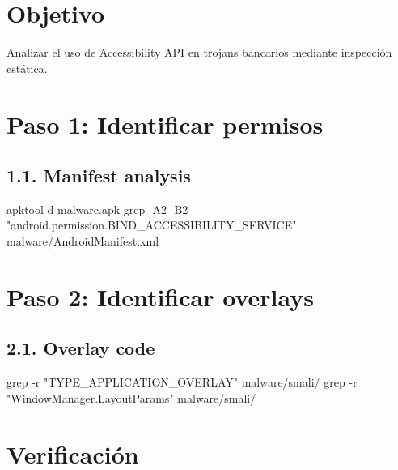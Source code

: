 \documentclass[
  letterpaper,
]{report}
\newenvironment{Shaded}{\begin{snugshade}}{\end{snugshade}}
\newcommand{\AttributeTok}[1]{\textcolor[rgb]{0.40,0.45,0.13}{#1}}
\newcommand{\ExtensionTok}[1]{\textcolor[rgb]{0.00,0.23,0.31}{#1}}
\newcommand{\FunctionTok}[1]{\textcolor[rgb]{0.28,0.35,0.67}{#1}}
\newcommand{\NormalTok}[1]{\textcolor[rgb]{0.00,0.23,0.31}{#1}}
\newcommand{\StringTok}[1]{\textcolor[rgb]{0.13,0.47,0.30}{#1}}
\begin{document}
\section{Objetivo}\label{objetivo-5}

Analizar el uso de Accessibility API en trojans bancarios mediante
inspección estática.

\section{Paso 1: Identificar
permisos}\label{paso-1-identificar-permisos}

\subsection{1.1. Manifest analysis}\label{manifest-analysis}

\begin{Shaded}
\begin{Highlighting}[]
\ExtensionTok{apktool}\NormalTok{ d malware.apk}
\FunctionTok{grep} \AttributeTok{{-}A2} \AttributeTok{{-}B2} \StringTok{"android.permission.BIND\_ACCESSIBILITY\_SERVICE"}\NormalTok{ malware/AndroidManifest.xml}
\end{Highlighting}
\end{Shaded}

\section{Paso 2: Identificar
overlays}\label{paso-2-identificar-overlays}

\subsection{2.1. Overlay code}\label{overlay-code}

\begin{Shaded}
\begin{Highlighting}[]
\FunctionTok{grep} \AttributeTok{{-}r} \StringTok{"TYPE\_APPLICATION\_OVERLAY"}\NormalTok{ malware/smali/}
\FunctionTok{grep} \AttributeTok{{-}r} \StringTok{"WindowManager.LayoutParams"}\NormalTok{ malware/smali/}
\end{Highlighting}
\end{Shaded}

\section{Verificación}\label{verificaciuxf3n-4}
\end{document}

